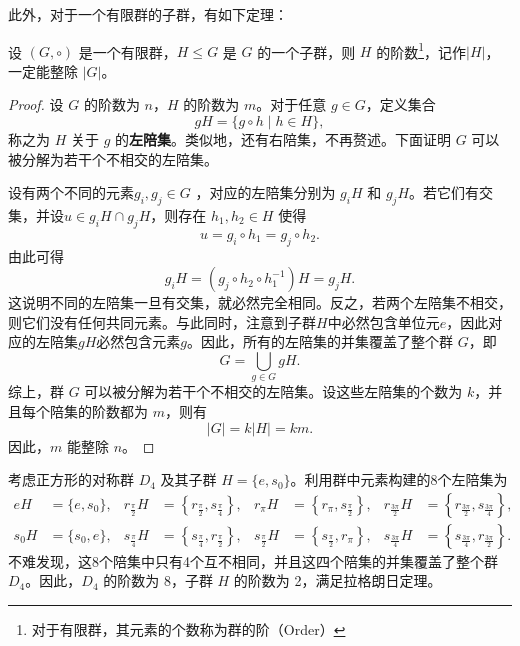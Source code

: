 此外，对于一个有限群的子群，有如下定理：
\begin{theorem}[拉格朗日定理]
    \label{thm_lagrange}
    设 \((G,\circ)\) 是一个有限群，\(H\le G\) 是 \(G\) 的一个子群，则 \(H\) 的阶数\footnote{对于有限群，其元素的个数称为群的阶（Order）}，记作\( |H| \)，一定能整除 \(|G|\)。
\end{theorem}
\begin{proof}
    设 \(G\) 的阶数为 \(n\)，\(H\) 的阶数为 \(m\)。对于任意 \(g\in G\)，定义集合
    \[
        gH=\{g\circ h\mid h\in H\},
    \]
    称之为 \(H\) 关于 \(g\) 的\textbf{左陪集}。类似地，还有右陪集，不再赘述。下面证明 \(G\) 可以被分解为若干个不相交的左陪集。

    设有两个不同的元素\( g_i,g_j\in G \) ，对应的左陪集分别为 \( g_iH \) 和 \( g_jH \)。若它们有交集，并设\( u \in g_iH \cap g_jH \)，则存在 \(h_1,h_2\in H\) 使得
    \[
        u=g_i\circ h_1=g_j\circ h_2.
    \]
    由此可得
    \[
        g_iH = (g_j \circ h_2 \circ h_1^{-1})H = g_jH.
    \]
    这说明不同的左陪集一旦有交集，就必然完全相同。反之，若两个左陪集不相交，则它们没有任何共同元素。与此同时，注意到子群\( H \)中必然包含单位元\( e \)，因此对应的左陪集\( gH \)必然包含元素\( g \)。因此，所有的左陪集的并集覆盖了整个群 \(G\)，即
    \[
        G = \bigcup_{g\in G} gH.
    \]
    综上，群 \(G\) 可以被分解为若干个不相交的左陪集。设这些左陪集的个数为 \(k\)，并且每个陪集的阶数都为 \(m\)，则有
    \[
        |G| = k |H| = k m.
    \]
    因此，\(m\) 能整除 \(n\)。
\end{proof}

\begin{example}
    \label{ex_lagrange_d4}
    考虑正方形的对称群 \(D_4\) 及其子群 \(H=\{e,s_0\}\)。利用群中元素构建的8个左陪集为
    \[
        \begin{aligned}
            eH                  & =\{e,s_0\},                                            &
            r_{\frac{\pi}{2}}H  & =\left\{r_{\frac{\pi}{2}},s_{\frac{\pi}{4}}\right\},   &
            r_\pi H             & =\left\{r_\pi,s_{\frac{\pi}{2}}\right\},               &
            r_{\frac{3\pi}{2}}H & =\left\{r_{\frac{3\pi}{2}},s_{\frac{3\pi}{4}}\right\},   \\
            s_0H                & =\{s_0,e\},                                            &
            s_{\frac{\pi}{4}}H  & =\left\{s_{\frac{\pi}{4}},r_{\frac{\pi}{2}}\right\},   &
            s_{\frac{\pi}{2}}H  & =\left\{s_{\frac{\pi}{2}},r_\pi\right\},               &
            s_{\frac{3\pi}{4}}H & =\left\{s_{\frac{3\pi}{4}},r_{\frac{3\pi}{2}}\right\}.
        \end{aligned}
    \]
    不难发现，这8个陪集中只有4个互不相同，并且这四个陪集的并集覆盖了整个群 \(D_4\)。因此，\(D_4\) 的阶数为 8，子群 \(H\) 的阶数为 2，满足拉格朗日定理。
\end{example}


